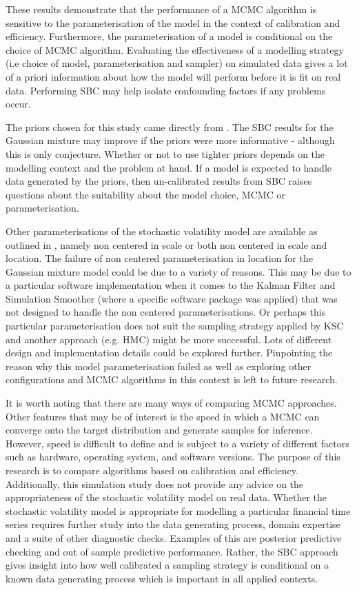 \documentclass[12pt, a4paper]{article}
\begin{document}
These results demonstrate that the performance of a MCMC algorithm is sensitive to the parameterisation of the model in the context of calibration and efficiency. Furthermore, the parameterisation of a model is conditional on the choice of MCMC algorithm. Evaluating the effectiveness of a modelling strategy (i.e choice of model, parameterisation and sampler) on simulated data gives a lot of a priori information about how the model will perform before it is fit on real data. Performing SBC may help isolate confounding factors if any problems occur. 

The priors chosen for this study came directly from \citet{kim1998stochastic}. The SBC results for the Gaussian mixture may improve if the priors were more informative - although this is only conjecture. Whether or not to use tighter priors depends on the modelling context and the problem at hand. If a model is expected to handle data generated by the priors, then un-calibrated results from SBC raises questions about the suitability about the model choice, MCMC or parameterisation. 

Other parameterisations of the stochastic volatility model are available as outlined in \citet{strickland2008parameterisation}, namely non centered in scale or both non centered in scale and location. The failure of non centered parameterisation in location for the Gaussian mixture model could be due to a variety of reasons. This may be due to a particular software implementation when it comes to the Kalman Filter and Simulation Smoother (where a specific software package was applied) that was not designed to handle the non centered parameterisations. Or perhaps this particular parameterisation does not suit the sampling strategy applied by KSC and another approach (e.g. HMC) might be more successful. Lots of different design and implementation details could be explored further. Pinpointing the reason why this model parameterisation failed as well as exploring other configurations and MCMC algorithms in this context is left to future research.

It is worth noting that there are many ways of comparing MCMC approaches. Other features that may be of interest is the speed in which a MCMC can converge onto the target distribution and generate samples for inference. However, speed is difficult to define and is subject to a variety of different factors such as hardware, operating system, and software versions. The purpose of this research is to compare algorithms based on calibration and efficiency. Additionally, this simulation study does not provide any advice on the appropriateness of the stochastic volatility model on real data. Whether the stochastic volatility model is appropriate for modelling a particular financial time series requires further study into the data generating process, domain expertise and a suite of other diagnostic checks. Examples of this are posterior predictive checking and out of sample predictive performance. Rather, the SBC approach gives insight into how well calibrated a sampling strategy is conditional on a known data generating process which is important in all applied contexts.  
\end{document}
